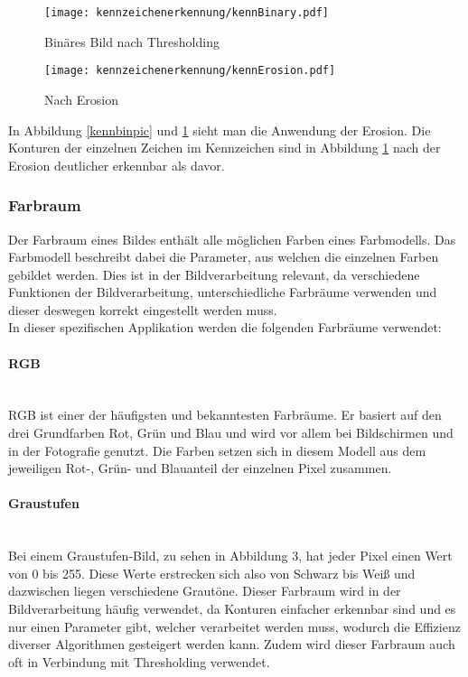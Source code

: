 \begin{figure}[htbp]
    \centering
    \begin{minipage}[t]{0.45\linewidth}
        \centering
        \texttt{[image: kennzeichenerkennung/kennBinary.pdf]}
        \caption{Binäres Bild nach Thresholding}
        \label{kennbinpic}
    \end{minipage}
    \hfill
    \begin{minipage}[t]{0.45\linewidth}
        \centering
        \texttt{[image: kennzeichenerkennung/kennErosion.pdf]}
        \caption{Nach Erosion}
        \label{eropic}
    \end{minipage}
\end{figure}

In Abbildung \ref{kennbinpic} und \ref{eropic} sieht man die Anwendung der Erosion. Die Konturen der einzelnen Zeichen im Kennzeichen sind in Abbildung 
\ref{eropic} nach der Erosion deutlicher erkennbar als davor.

\subsubsection{Farbraum}
Der Farbraum eines Bildes enthält alle möglichen Farben eines Farbmodells. Das Farbmodell beschreibt dabei die Parameter, aus 
welchen die einzelnen Farben gebildet werden. Dies ist in der Bildverarbeitung relevant, da verschiedene Funktionen der 
Bildverarbeitung, unterschiedliche Farbräume verwenden und dieser deswegen korrekt eingestellt werden muss.\\

In dieser spezifischen Applikation werden die folgenden Farbräume verwendet:

\paragraph{RGB}\mbox{}\\
RGB ist einer der häufigsten und bekanntesten Farbräume. Er basiert auf den drei Grundfarben Rot, Grün und Blau und wird vor 
allem bei Bildschirmen und in der Fotografie genutzt. Die Farben setzen sich in diesem Modell aus dem jeweiligen Rot-, Grün- 
und Blauanteil der einzelnen Pixel zusammen.

\paragraph{Graustufen}\mbox{}\\
Bei einem Graustufen-Bild, zu sehen in Abbildung 3, hat jeder Pixel einen Wert von 0 bis 255. Diese Werte erstrecken sich also 
von Schwarz bis Weiß und dazwischen liegen verschiedene Grautöne. Dieser Farbraum wird in der Bildverarbeitung häufig verwendet, 
da Konturen einfacher erkennbar sind und es nur einen Parameter gibt, welcher verarbeitet werden muss, wodurch die Effizienz 
diverser Algorithmen gesteigert werden kann. Zudem wird dieser Farbraum auch oft in Verbindung mit Thresholding verwendet.

